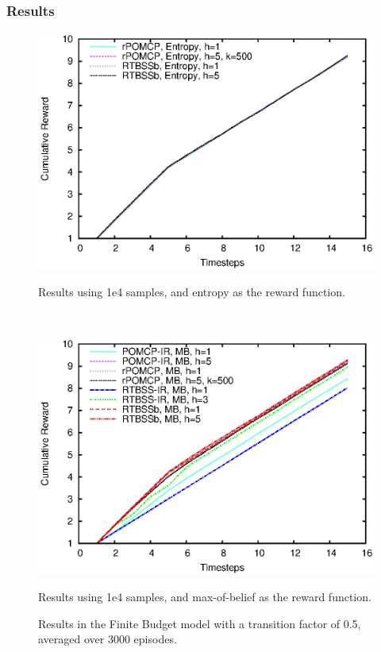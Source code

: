 \documentclass[xcolor={dvipsnames}]{beamer}
\begin{document}
\begin{frame}
    \frametitle{Results}

\begin{figure}[ht!]
        \centering
        \begin{minipage}[t]{0.45\textwidth}
                \includegraphics[width=\textwidth]{../images/Images/FiniteBudgetResults/0.5/1e4/E/output}
                \caption{Results using 1e4 samples, and entropy as the reward function.}
                \label{fig:fb4e5}
        \end{minipage}%
        ~ %
        \begin{minipage}[t]{0.45\textwidth}
                \includegraphics[width=\textwidth]{../images/Images/FiniteBudgetResults/0.5/1e4/MB/output}
                \caption{Results using 1e4 samples, and max-of-belief as the reward function.}
                \label{fig:fb5e5}
        \end{minipage}
        \caption{Results in the Finite Budget model with a transition factor of 0.5, averaged over 3000 episodes.}
        \label{ref:fbentropyfig5}
\end{figure}
\end{frame}
\end{document}
